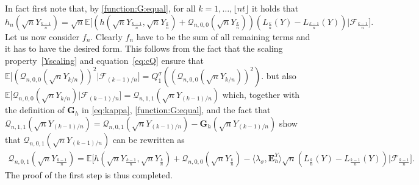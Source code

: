 \documentclass[12pt]{article}
\numberwithin{equation}{section}
\theoremstyle{definition}
\theoremstyle{remark}
\newcommand{\EE}{\mathbb{E}}
\newcommand{\cQ}{\mathcal{Q}}
\newcommand{\cF}{\mathcal{F}}
\newcommand{\bfH}[1]{\mathbf{E}^Y_{#1}}
\newcommand{\bfG}[1]{\mathbf{G}_{#1}}
\begin{document}
In fact first note that, by \eqref{function:G:equal}, for all $k =1, \ldots, {\lfloor n t \rfloor}$ it holds that
\begin{equation}
	h_n(\sqrt{n} Y_{\frac{k-1}{n}})= \sqrt{n} \EE\Big[ (h(\sqrt{n} Y_{\frac{k-1}{n}}, \sqrt{n} Y_{\frac{k}{n}}) + \cQ_{n,0,0}(\sqrt{n} Y_{\frac{k}{n}}) ) (L_{\frac{k}{n}}(Y) - L_{\frac{k-1}n}(Y))  | \cF_{\frac{k-1}n}\Big] .
\end{equation}
Let us now consider $f_n$.
Clearly $f_n$ have to be the sum of all remaining terms and it has to have the desired form. 
This follows from the fact that the scaling property~\eqref{Yscaling} and equation~\eqref{eq:cQ} ensure that
$\EE\Big[ 
		(\cQ_{n,0,0}(\sqrt{n} Y_{k/n}))^2  | \cF_{(k-1)/n}\Big] 
= Q^\sigma_1 (
		(\cQ_{n,0,0}(\sqrt{n} Y_{k/n}))^2 ).
$
but also
$\EE\Big[ \cQ_{n,0,0}(\sqrt{n} Y_{k/n})  | \cF_{(k-1)/n}\Big] = \cQ_{n,1,1}(\sqrt n Y_{(k-1)/n})$
which, together with the definition of $\bfG{h}$ in \eqref{eq:kappa}, \eqref{function:G:equal}, and the fact that
$ \cQ_{n,1,1}(\sqrt{n} Y_{(k-1)/n})   =  \cQ_{n,0,1}(\sqrt{n} Y_{(k-1)/n}) -  \bfG{h}(\sqrt{n} Y_{(k-1)/n}) $
show that $\cQ_{n,0,1}(\sqrt{n} Y_{(k-1)/n})$ can be rewritten as 
\begin{equation}
\begin{split}
	\cQ_{n,0,1}(\sqrt{n} Y_{\frac{k-1}{n}})  
	=  
	 \EE\Big[ h(\sqrt{n} Y_{\frac{k-1}n}, \sqrt{n} Y_{\frac{k}{n}}) + \cQ_{n,0,0}(\sqrt{n} Y_{\frac{k}n}) -\langle \lambda_\sigma , \bfH h \rangle \sqrt{n} ( L_{\frac{k}n}(Y) - L_{\frac{k-1}n}(Y) ) | \cF_{\frac{k-1}n}\Big] .
\end{split}	
\end{equation}
The proof of the first step is thus completed.
\end{document}

